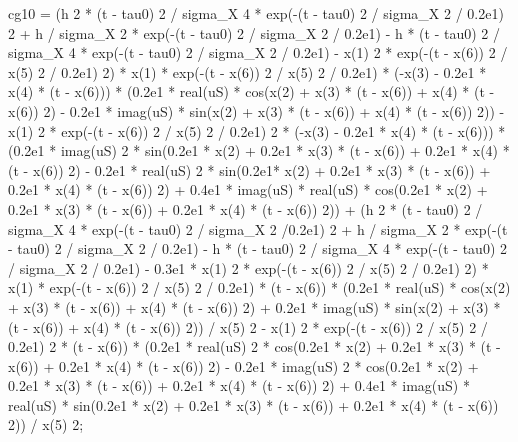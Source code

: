 \begin{maplegroup}
cg10 = (h  2 * (t - tau0)  2 / sigma\_X  4 * exp(-(t - tau0)  2 / sigma\_X  2 / 0.2e1)  2 + h / sigma\_X  2 * exp(-(t - tau0)  2 / sigma\_X  2 / 0.2e1) - h * (t - tau0)  2 / sigma\_X  4 * exp(-(t - tau0)  2 / sigma\_X  2 / 0.2e1) - x(1)  2 * exp(-(t - x(6))  2 / x(5)  2 / 0.2e1)  2) * x(1) * exp(-(t - x(6))  2 / x(5)  2 / 0.2e1) * (-x(3) - 0.2e1 * x(4) * (t - x(6))) * (0.2e1 * real(uS) * cos(x(2) + x(3) * (t - x(6)) + x(4) * (t - x(6))  2) - 0.2e1 * imag(uS) * sin(x(2) + x(3) * (t - x(6)) + x(4) * (t - x(6))  2)) - x(1)  2 * exp(-(t - x(6))  2 / x(5)  2 / 0.2e1)  2 * (-x(3) - 0.2e1 * x(4) * (t - x(6))) * (0.2e1 * imag(uS)  2 * sin(0.2e1 * x(2) + 0.2e1 * x(3) * (t - x(6)) + 0.2e1 * x(4) * (t - x(6))  2) - 0.2e1 * real(uS)  2 * sin(0.2e1* x(2) + 0.2e1 * x(3) * (t - x(6)) + 0.2e1 * x(4) * (t - x(6))  2) + 0.4e1 * imag(uS) * real(uS) * cos(0.2e1 * x(2) + 0.2e1 * x(3) * (t - x(6)) + 0.2e1 * x(4) * (t - x(6))  2)) + (h  2 * (t - tau0)  2 / sigma\_X  4 * exp(-(t - tau0)  2 / sigma\_X  2 /0.2e1)  2 + h / sigma\_X  2 * exp(-(t - tau0)  2 / sigma\_X  2 / 0.2e1) - h * (t - tau0)  2 / sigma\_X  4 * exp(-(t - tau0)  2 / sigma\_X  2 / 0.2e1) - 0.3e1 * x(1)  2 * exp(-(t - x(6))  2 / x(5)  2 / 0.2e1)  2) * x(1) * exp(-(t - x(6))  2 / x(5) 2 / 0.2e1) * (t - x(6)) * (0.2e1 * real(uS) * cos(x(2) + x(3) * (t - x(6)) + x(4) * (t - x(6))  2) + 0.2e1 * imag(uS) * sin(x(2) + x(3) * (t - x(6)) + x(4) * (t - x(6))  2)) / x(5)  2 - x(1)  2 * exp(-(t - x(6))  2 / x(5)  2 / 0.2e1)  2 * (t - x(6)) * (0.2e1 * real(uS)  2 * cos(0.2e1 * x(2) + 0.2e1 * x(3) * (t - x(6)) + 0.2e1 * x(4) * (t - x(6))  2) - 0.2e1 * imag(uS)  2 * cos(0.2e1 * x(2) + 0.2e1 * x(3) * (t - x(6)) + 0.2e1 * x(4) * (t - x(6))  2) + 0.4e1 * imag(uS) * real(uS) * sin(0.2e1 * x(2) + 0.2e1 * x(3) * (t - x(6)) + 0.2e1 * x(4) * (t - x(6))  2)) / x(5)  2;
\end{maplegroup}
\begin{maplegroup}
\begin{mapleinput}
\end{mapleinput}
\end{maplegroup}
